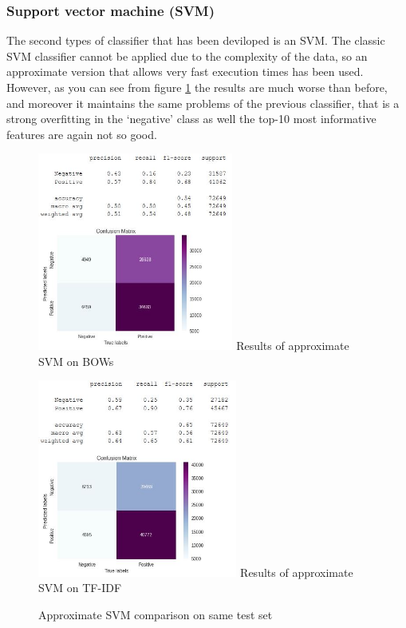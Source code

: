 \documentclass[11pt]{article}
\begin{document}
\subsubsection{Support vector machine (SVM)}
The second types of classifier that has been deviloped is an SVM. The classic SVM classifier cannot be applied due to the complexity of the data, so an approximate version that allows very fast execution times has been used. However, as you can see from figure \ref{svm_fig} the results are much worse than before, and moreover it maintains the same problems of the previous classifier, that is a strong overfitting in the `negative' class as well the top-10 most informative features are again not so good. 
\begin{figure}[H]
	\begin{minipage}[b]{0.48\textwidth}
		\centering
		\includegraphics[width=\textwidth, height = 6.5cm]{svm_bow.JPG}
		{Results of approximate SVM on BOWs}
	\end{minipage}
	\hfill
	\begin{minipage}[b]{0.48\textwidth}
		\centering
		\includegraphics[width=\textwidth, height = 6.5cm]{svm_tfidf.JPG}
		{Results of approximate SVM on TF-IDF}
	\end{minipage}
	\caption{Approximate SVM comparison on same test set}
	\label{svm_fig}
\end{figure}
\end{document}
